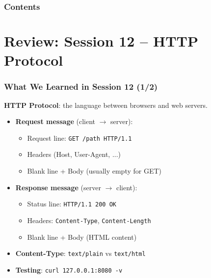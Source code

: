\documentclass[xcolor=table]{beamer}
\title[\asignatura]{\asignatura}
\subtitle{\grado}
\author{URJC}
\institute{GSyC}
\date{Course \curso}
\begin{document}
\frame{
\maketitle
}

\begin{frame}
\frametitle{Contents}
\tableofcontents
\end{frame}


\section{Review: Session 12 -- HTTP Protocol}

\begin{frame}[fragile]
\frametitle{What We Learned in Session 12 (1/2)}

\textbf{HTTP Protocol}: the language between browsers and web servers.

\begin{itemize}
\item \textbf{Request message} (client $\rightarrow$ server):
  \begin{itemize}
  \item Request line: \texttt{GET /path HTTP/1.1}
  \item Headers (Host, User-Agent, ...)
  \item Blank line + Body (usually empty for GET)
  \end{itemize}
\vspace{0.15cm}
\item \textbf{Response message} (server $\rightarrow$ client):
  \begin{itemize}
  \item Status line: \texttt{HTTP/1.1 200 OK}
  \item Headers: \texttt{Content-Type}, \texttt{Content-Length}
  \item Blank line + Body (HTML content)
  \end{itemize}
\vspace{0.15cm}
\item \textbf{Content-Type}: \texttt{text/plain} vs \texttt{text/html}
\item \textbf{Testing}: \texttt{curl 127.0.0.1:8080 -v}
\end{itemize}

\end{frame}
\end{document}
